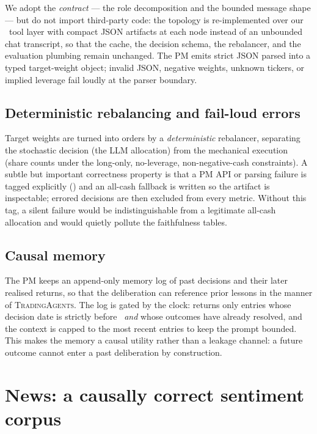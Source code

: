 We adopt the \emph{contract} --- the role decomposition and the bounded message shape --- but
do not import third-party code: the topology is re-implemented over our \mcp\ tool layer
with compact JSON artifacts at each node instead of an unbounded chat transcript, so that the
cache, the decision schema, the rebalancer, and the evaluation plumbing remain unchanged. The
PM emits strict JSON parsed into a typed target-weight object; invalid JSON, negative weights,
unknown tickers, or implied leverage fail loudly at the parser boundary.

\subsection{Deterministic rebalancing and fail-loud errors}

Target weights are turned into orders by a \emph{deterministic} rebalancer, separating the
stochastic decision (the LLM allocation) from the mechanical execution (share counts under
the long-only, no-leverage, non-negative-cash constraints). A subtle but important
correctness property is that a PM API or parsing failure is tagged explicitly
() and an all-cash fallback is written so the artifact is inspectable;
errored decisions are then excluded from every metric. Without this tag, a silent failure
would be indistinguishable from a legitimate all-cash allocation and would quietly pollute
the faithfulness tables.

\subsection{Causal memory}

The PM keeps an append-only memory log of past decisions and their later realised returns,
so that the deliberation can reference prior lessons in the manner of
\textsc{TradingAgents}. The log is gated by the clock: 
returns only entries whose decision date is strictly before \tnow\ \emph{and} whose outcomes
have already resolved, and the context is capped to the most recent entries to keep the
prompt bounded. This makes the memory a causal utility rather than a leakage channel: a
future outcome cannot enter a past deliberation by construction.

\section{News: a causally correct sentiment corpus}
\label{sec:news}

